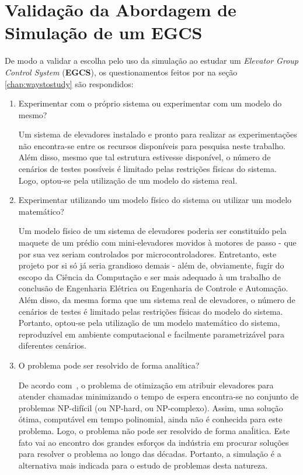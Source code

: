 \section{Validação da Abordagem de Simulação de um EGCS}

De modo a validar a escolha pelo uso da simulação ao estudar um \textit{Elevator
Group Control System} (\textbf{EGCS}), os questionamentos feitos por
\cite{Banks,Law} na seção \ref{chap:waystostudy} são respondidos:

\begin{enumerate}
\item Experimentar com o próprio sistema ou experimentar com um modelo do mesmo?

Um sistema de elevadores instalado e pronto para realizar as experimentações não
encontra-se entre os recursos disponíveis para pesquisa neste trabalho. Além
disso, mesmo que tal estrutura estivesse disponível, o número de cenários de
testes possíveis é limitado pelas restrições físicas do sistema. Logo, optou-se
pela utilização de um modelo do sistema real.

\item Experimentar utilizando um modelo físico do sistema ou utilizar um modelo
matemático?

Um modelo físico de um sistema de elevadores poderia ser constituído pela
maquete de um prédio com mini-elevadores movidos à motores de passo - que por
sua vez seriam controlados por microcontroladores. Entretanto, este projeto por
si só já seria grandioso demais - além de, obviamente, fugir do escopo da
Ciência da Computação e ser mais adequado à um trabalho de conclusão de
Engenharia Elétrica ou Engenharia de Controle e Automação. Além disso, da mesma
forma que um sistema real de elevadores, o número de cenários de testes é
limitado pelas restrições físicas do modelo do sistema. Portanto, optou-se pela
utilização de um modelo matemático do sistema, reproduzível em ambiente
computacional e facilmente parametrizável para diferentes cenários.

\item O problema pode ser resolvido de forma analítica?

De acordo com~\cite{SeKo99}, o problema de otimização em atribuir elevadores
para atender chamadas minimizando o tempo de espera encontra-se no conjunto de
problemas NP-difícil (ou NP-hard, ou NP-complexo). Assim, uma solução ótima,
computável em tempo polinomial, ainda não é conhecida para este problema. Logo,
o problema não pode ser resolvido de forma anaĺitica. Este fato vai ao encontro
dos grandes esforços da indústria em procurar soluções para resolver o problema
ao longo das décadas. Portanto, a simulação é a alternativa mais indicada para o
estudo de problemas desta natureza.

\end{enumerate}

